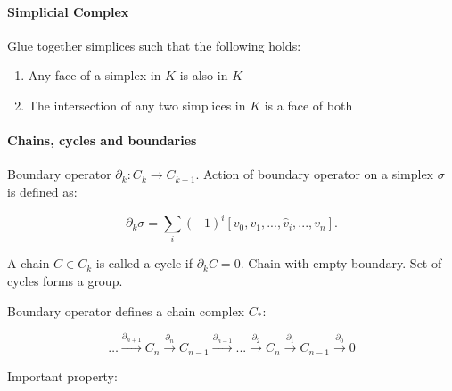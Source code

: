 \begin{figure}
\centering
\caption[Simplices]{}
\label{background:fig:simplices}
\end{figure}

\paragraph{Simplicial Complex}

Glue together simplices such that the following holds:

\begin{enumerate}
\item Any face of a simplex in $K$ is also in $K$
\item The intersection of any two simplices in $K$ is a face of both 
\end{enumerate}

\begin{figure}
\centering
\caption[Simplicial Complex]{}
\label{background:fig:simplicial_complex}
\end{figure}

\paragraph{Chains, cycles and boundaries}

Boundary operator $\partial_{k}:C_{k}\rightarrow C_{k-1}$.
Action of boundary operator on a simplex $\sigma$ is defined as: 

\begin{equation}
\partial_{k}\sigma = \displaystyle\sum_{i}(-1)^{i}[v_{0},v_{1},...,\hat{v}_{i},...,v_{n}].
\end{equation}

A chain $C\in C_{k}$ is called a cycle if $\partial_{k}C=0$.
Chain with empty boundary.
Set of cycles forms a group.

Boundary operator defines a chain complex $C_{*}$:

\begin{equation}
\dots \overset{\partial_{n+1}}{\longrightarrow} C_n \overset{\partial_{n}}{\longrightarrow} C_{n-1} \overset{\partial_{n-1}}{\longrightarrow}  ... \overset{\partial_{2}}{\longrightarrow} C_n \overset{\partial_{1}}{\longrightarrow} C_{n-1} \overset{\partial_{0}}{\longrightarrow}  0
\end{equation}

Important property:

